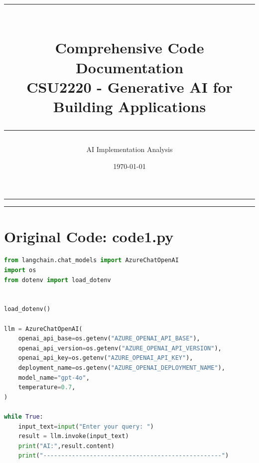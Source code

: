 \documentclass[11pt, a4paper]{article}
\title{%
    \vspace{-1cm}
    \textcolor{primaryBlue}{\rule{\linewidth}{2pt}}\\[0.8em]
    {\Huge\bfseries\sffamily\textcolor{darkText}{Comprehensive Code Documentation}}\\[0.3em]
    {\Large\sffamily\textcolor{subtleGray}{CSU2220 - Generative AI for Building Applications}}\\[0.5em]
    \textcolor{primaryBlue}{\rule{\linewidth}{2pt}}
}
\author{\sffamily\textcolor{subtleGray}{AI Implementation Analysis}}
\date{\sffamily\textcolor{subtleGray}{\today}}
\renewcommand{\headrulewidth}{0.5pt}
\renewcommand{\footrulewidth}{0pt}
\renewcommand{\headrule}{\hbox to\headwidth{\color{borderColor}\leaders\hrule height \headrulewidth\hfill}}
\begin{document}
\pagestyle{empty}
{\centering\color{teal!40}\rule{\linewidth}{2.5pt}\par}
\maketitle
{\centering\color{teal!40}\rule{\linewidth}{2.5pt}\par}

\vspace{2em}

\begin{tcolorbox}[
    enhanced,
    breakable,  %
    colback=lightBg,
    colframe=primaryBlue,
    boxrule=1.5pt,
    arc=4pt,
    left=10pt,
    right=10pt,
    top=10pt,
    bottom=10pt,
    fonttitle=\bfseries\Large,
    title={\textcolor{primaryBlue}{Table of Contents}},
    coltitle=white,
    colbacktitle=primaryBlue,
    shadow={2pt}{-2pt}{0pt}{black!15},
]
\tableofcontents
\end{tcolorbox}

\clearpage

\pagestyle{fancy}
\fancyhf{}
\lfoot{\textcolor{gray!60!black}{Page \thepage}}
\renewcommand{\headrulewidth}{0.5pt}
\renewcommand{\footrulewidth}{0.5pt}
\renewcommand{\headrule}{\color{teal!40}\hrule width\headwidth height\headrulewidth \vskip-\headrulewidth}
\renewcommand{\footrule}{\color{teal!40}\hrule width\headwidth height\footrulewidth}
\onehalfspacing

\section{Original Code: code1.py}
\vspace{0.5em}
\begin{lstlisting}[language=Python]
from langchain.chat_models import AzureChatOpenAI
import os
from dotenv import load_dotenv


load_dotenv()

llm = AzureChatOpenAI(
    openai_api_base=os.getenv("AZURE_OPENAI_API_BASE"),
    openai_api_version=os.getenv("AZURE_OPENAI_API_VERSION"),
    openai_api_key=os.getenv("AZURE_OPENAI_API_KEY"),
    deployment_name=os.getenv("AZURE_OPENAI_DEPLOYMENT_NAME"),
    model_name="gpt-4o",
    temperature=0.7,
)

while True:
    input_text=input("Enter your query: ")
    result = llm.invoke(input_text)
    print("AI:",result.content)
    print("--------------------------------------------------")
\end{lstlisting}
\end{document}
